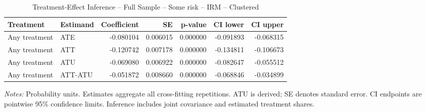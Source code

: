 \begin{table}[htbp]
\centering
\caption{Treatment-Effect Inference -- Full Sample -- Some risk -- IRM -- Clustered}
\label{tab:inference-SomeRiskHome-IRM-clustered}
\scriptsize
\begin{adjustbox}{max width=\linewidth}
\begin{tabular}{llrrrrr}
\toprule
Treatment & Estimand & Coefficient & SE & p-value & CI lower & CI upper \\
\midrule
Any treatment & ATE & -0.080104 & 0.006015 & 0.000000 & -0.091893 & -0.068315 \\
Any treatment & ATT & -0.120742 & 0.007178 & 0.000000 & -0.134811 & -0.106673 \\
Any treatment & ATU & -0.069080 & 0.006922 & 0.000000 & -0.082647 & -0.055512 \\
Any treatment & ATT-ATU & -0.051872 & 0.008660 & 0.000000 & -0.068846 & -0.034899 \\
\bottomrule
\end{tabular}

\end{adjustbox}
\par\smallskip
\begin{minipage}{\linewidth}\scriptsize \textit{Notes:} Probability units. Estimates aggregate all cross-fitting repetitions. ATU is derived; SE denotes standard error. CI endpoints are pointwise 95\% confidence limits. Inference includes joint covariance and estimated treatment shares. \end{minipage}
\end{table}


